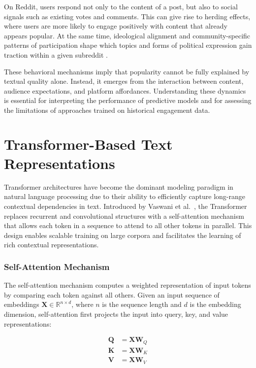 On Reddit, users respond not only to the content of a post, but also to social signals such as existing votes and comments. This can give rise to herding effects, where users are more likely to engage positively with content that already appears popular. At the same time, ideological alignment and community-specific patterns of participation shape which topics and forms of political expression gain traction within a given subreddit \cite{waller2021quantifying}.

These behavioral mechanisms imply that popularity cannot be fully explained by textual quality alone. Instead, it emerges from the interaction between content, audience expectations, and platform affordances. Understanding these dynamics is essential for interpreting the performance of predictive models and for assessing the limitations of approaches trained on historical engagement data.

\section{Transformer-Based Text Representations}

Transformer architectures have become the dominant modeling paradigm in natural language processing due to their ability to efficiently capture long-range contextual dependencies in text. Introduced by Vaswani et al.~\cite{Vaswani2017}, the Transformer replaces recurrent and convolutional structures with a self-attention mechanism that allows each token in a sequence to attend to all other tokens in parallel. This design enables scalable training on large corpora and facilitates the learning of rich contextual representations.

\subsubsection{Self-Attention Mechanism}

The self-attention mechanism computes a weighted representation of input tokens by comparing each token against all others. Given an input sequence of embeddings $\mathbf{X} \in \mathbb{R}^{n \times d}$, where $n$ is the sequence length and $d$ is the embedding dimension, self-attention first projects the input into query, key, and value representations:

\begin{align}
\mathbf{Q} &= \mathbf{X}\mathbf{W}_Q \\
\mathbf{K} &= \mathbf{X}\mathbf{W}_K \\
\mathbf{V} &= \mathbf{X}\mathbf{W}_V
\end{align}

